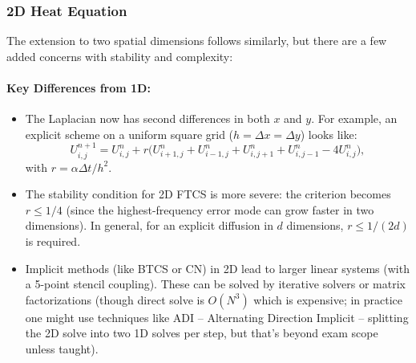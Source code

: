 \documentclass[a4paper,11pt]{article}
\begin{document}
\subsubsection{2D Heat Equation}
The extension to two spatial dimensions follows similarly, but there are a few added concerns with stability and complexity:
\paragraph{Key Differences from 1D:}
\begin{itemize}
    \item The Laplacian now has second differences in both $x$ and $y$. For example, an explicit scheme on a uniform square grid ($h = \Delta x = \Delta y$) looks like:
          $$U_{i,j}^{n+1} = U_{i,j}^n + r \Big(U_{i+1,j}^n + U_{i-1,j}^n + U_{i,j+1}^n + U_{i,j-1}^n - 4U_{i,j}^n\Big),$$
          with $r = \alpha\Delta t/h^2$.
    \item The stability condition for 2D FTCS is more severe: the criterion becomes $r \le 1/4$ (since the highest-frequency error mode can grow faster in two dimensions). In general, for an explicit diffusion in $d$ dimensions, $r \le 1/(2d)$ is required.
    \item Implicit methods (like BTCS or CN) in 2D lead to larger linear systems (with a 5-point stencil coupling). These can be solved by iterative solvers or matrix factorizations (though direct solve is $O(N^3)$ which is expensive; in practice one might use techniques like ADI -- Alternating Direction Implicit -- splitting the 2D solve into two 1D solves per step, but that’s beyond exam scope unless taught).
\end{itemize}
\end{document}
